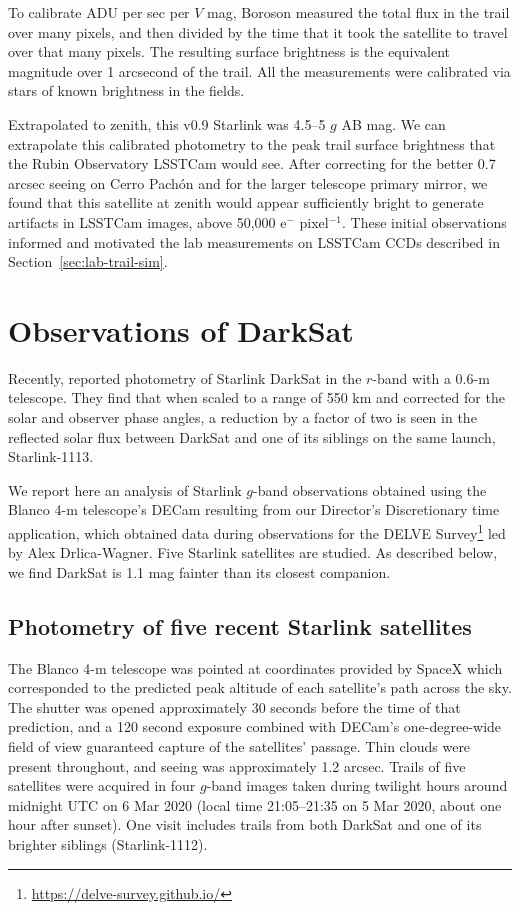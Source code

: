 \documentclass[twocolumn,trackchanges]{aastex63}
\begin{document}
To calibrate ADU per sec per $V$ mag, Boroson measured the total flux in the trail over many pixels, and then divided by the time that it took the satellite to travel over that many pixels. The resulting surface brightness is the equivalent magnitude over 1 arcsecond of the trail. All the measurements were calibrated via stars of known brightness in the fields.

Extrapolated to zenith, this v0.9 Starlink was 4.5--5 $g$ AB mag. We can extrapolate this calibrated photometry to the peak trail surface brightness that the Rubin Observatory LSSTCam would see. After correcting for the better 0.7 arcsec seeing on Cerro Pach\'on and for the larger telescope primary mirror, we found that this satellite at zenith would appear sufficiently bright to generate artifacts in LSSTCam images, above 50,000 e$^{-}$ pixel$^{-1}$. These initial observations informed and motivated the lab measurements on LSSTCam CCDs described in Section~\ref{sec:lab-trail-sim}.

\section{Observations of DarkSat}
\label{sec:obs-darksat}

Recently, \citet{2020A&A...637L...1T} reported photometry of Starlink DarkSat in the $r$-band with a 0.6-m telescope. They find that when scaled to a range of 550 km and corrected for the solar and observer phase angles, a reduction by a factor of two is seen in the reflected solar flux between DarkSat and one of its siblings on the same launch, Starlink-1113.

We report here an analysis of Starlink $g$-band observations obtained using the Blanco 4-m telescope's DECam resulting from our Director's Discretionary time application, which obtained data during observations for the DELVE Survey\footnote{\url{https://delve-survey.github.io/}} led by Alex Drlica-Wagner. Five Starlink satellites are studied. As described below, we find DarkSat is 1.1 mag fainter than its closest companion.


\subsection{Photometry of five recent Starlink satellites}
\label{subsec:decam-photometry}

The Blanco 4-m telescope was pointed at coordinates provided by SpaceX which corresponded to the predicted peak altitude of each satellite's path across the sky. The shutter was opened approximately 30 seconds before the time of that prediction, and a 120 second exposure combined with DECam's one-degree-wide field of view guaranteed capture of the satellites' passage. Thin clouds were present throughout, and seeing was approximately 1.2 arcsec. Trails of five satellites were acquired in four $g$-band images taken during twilight hours around midnight UTC on 6 Mar 2020 (local time 21:05--21:35 on 5 Mar 2020, about one hour after sunset). One visit includes trails from both DarkSat and one of its brighter siblings (Starlink-1112).
\end{document}

